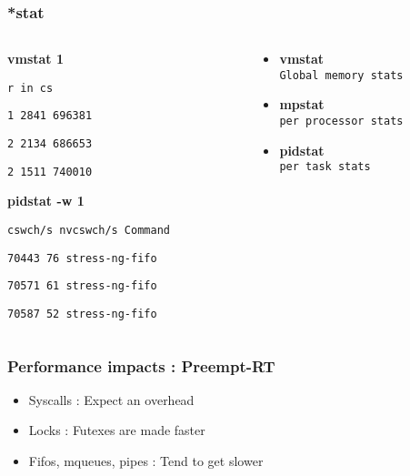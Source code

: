 \begin{frame}
	\frametitle{*stat}
	\begin{columns}
		\begin{column}[t]{0.5\linewidth}
\textbf{vmstat 1}

\texttt{r in   cs}

\texttt{1 2841 696381 }

\texttt{2 2134 686653 }

\texttt{2 1511 740010 }

			\vspace{1cm}
\textbf{pidstat -w 1}

\texttt{cswch/s nvcswch/s  Command }

\texttt{70443   76 stress-ng-fifo }

\texttt{70571   61 stress-ng-fifo }

\texttt{70587   52 stress-ng-fifo }

		\end{column}
		\begin{column}[t]{0.5\linewidth}
			\begin{itemize}
				\item \textbf{vmstat} \\ {\small{\texttt{Global memory stats}}}
				\item \textbf{mpstat} \\ {\small{\texttt{per processor stats}}}
				\item \textbf{pidstat}\\ {\small{\texttt{per task stats}}}
			\end{itemize}
		\end{column}
	\end{columns}
\end{frame}

\begin{frame}
	\frametitle{Performance impacts : Preempt-RT}
	\begin{itemize}
		\item Syscalls : Expect an overhead
		\item Locks : Futexes are made faster
		\item Fifos, mqueues, pipes : Tend to get slower
	\end{itemize}
\end{frame}

